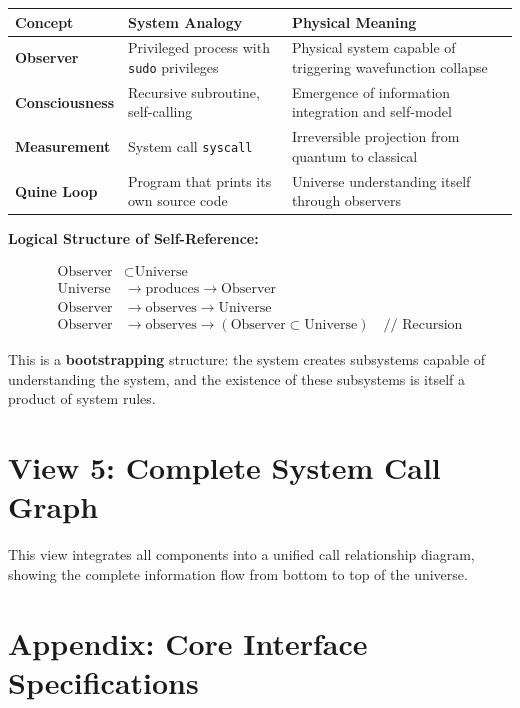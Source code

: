 \begin{table}[h]
\centering
\begin{tabular}{|l|l|l|}
\hline
\textbf{Concept} & \textbf{System Analogy} & \textbf{Physical Meaning} \\
\hline
\textbf{Observer} & Privileged process with \texttt{sudo} privileges & Physical system capable of triggering wavefunction collapse \\
\hline
\textbf{Consciousness} & Recursive subroutine, self-calling & Emergence of information integration and self-model \\
\hline
\textbf{Measurement} & System call \texttt{syscall} & Irreversible projection from quantum to classical \\
\hline
\textbf{Quine Loop} & Program that prints its own source code & Universe understanding itself through observers \\
\hline
\end{tabular}
\end{table}

\textbf{Logical Structure of Self-Reference:}

\begin{align*}
\text{Observer} &\subset \text{Universe} \\
\text{Universe} &\to \text{produces} \to \text{Observer} \\
\text{Observer} &\to \text{observes} \to \text{Universe} \\
\text{Observer} &\to \text{observes} \to (\text{Observer} \subset \text{Universe}) \quad \text{// Recursion}
\end{align*}

This is a \textbf{bootstrapping} structure: the system creates subsystems capable of understanding the system, and the existence of these subsystems is itself a product of system rules.

\section{View 5: Complete System Call Graph}

This view integrates all components into a unified call relationship diagram, showing the complete information flow from bottom to top of the universe.

\section{Appendix: Core Interface Specifications}

